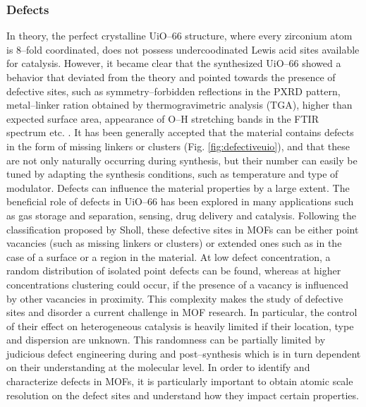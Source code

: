 \subsubsection*{Defects}
In theory, the perfect crystalline UiO--66 structure, where every zirconium atom is 8--fold coordinated, does not possess undercoodinated Lewis acid sites available for catalysis. However, it became clear that the synthesized UiO--66 showed a behavior that deviated from the theory and pointed towards the presence of defective sites, such as symmetry--forbidden reflections in the PXRD pattern, metal--linker ration obtained by thermogravimetric analysis (TGA), higher than expected surface area, appearance of O--H stretching bands in the FTIR spectrum etc. \cite{shearer2014tuned, valenzano2011disclosing}. It has been generally accepted that the material contains defects in the form of missing linkers or clusters (Fig. \ref{fig:defectiveuio}), and that these are not only naturally occurring during synthesis, but their number can easily be tuned by adapting the synthesis conditions, such as temperature and type of modulator\cite{wu2013unusual, shearer2016defect}.
\npar
Defects can influence the material properties by a large extent. The beneficial role of defects in UiO--66 has been explored in many applications such as gas storage and separation\cite{wu2013unusual, ren2014modulated}, sensing\cite{stassen2016towards}, drug delivery\cite{cunha2013rationale} and catalysis\cite{vermoortele2013synthesis, rogge2017metal}. 
Following the classification proposed by Sholl, these defective sites in MOFs can be either point vacancies (such as missing linkers or clusters) or extended ones such as in the case of a surface \cite{sholl2015defects} or a region in the material. At low defect concentration, a random distribution of isolated point defects can be found, whereas at higher concentrations clustering could occur, if the presence of a vacancy is influenced by other vacancies in proximity. This complexity makes the study of defective sites and disorder a current challenge in MOF research. In particular, the control of their effect on heterogeneous catalysis is heavily limited if their location, type and dispersion are unknown. This randomness can be partially limited by judicious defect engineering during and post--synthesis which is in turn dependent on their understanding at the molecular level. In order to identify and characterize defects in MOFs, it is particularly important to obtain atomic scale resolution on the defect sites and understand how they impact certain properties.
